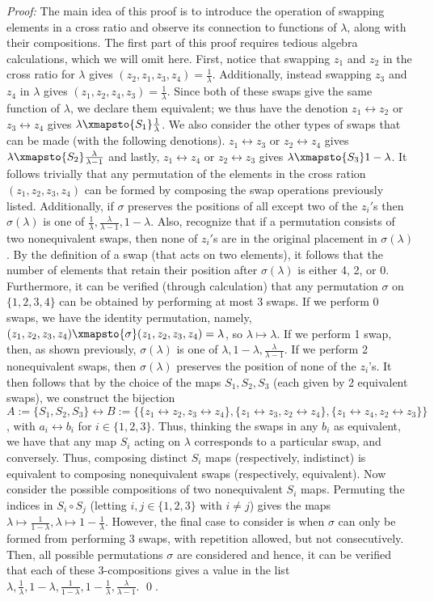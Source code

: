 \textit{Proof: } The main idea of this proof is to introduce the operation of swapping elements in a cross ratio and observe its connection to functions of $\lambda$, along with their compositions. The first part of this proof requires tedious algebra calculations, which we will omit here. First, notice that swapping $z_1$ and $z_2$ in the cross ratio for $\lambda$ gives $(z_2,z_1,z_3,z_4) = \frac{1}{\lambda}$. Additionally, instead swapping $z_3$ and $z_4$ in $\lambda$ gives $(z_1,z_2,z_4,z_3) = \frac{1}{\lambda}$. Since both of these swaps give the same function of $\lambda$, we declare them equivalent; we thus have the denotion $z_1 \leftrightarrow z_2$ or $z_3 \leftrightarrow z_4$ gives $\lambda \xmapsto{S_1} \frac{1}{\lambda}$. We also consider the other types of swaps that can be made (with the following denotions). $z_1 \leftrightarrow z_3$ or $z_2 \leftrightarrow z_4$ gives $\lambda \xmapsto{S_2} \frac{\lambda}{\lambda - 1}$ and lastly, $z_1 \leftrightarrow z_4$ or $z_2 \leftrightarrow z_3$ gives $\lambda \xmapsto{S_3} 1 - \lambda$. It follows trivially that any permutation of the elements in the cross ration $(z_1,z_2,z_3,z_4)$ can be formed by composing the swap operations previously listed. Additionally, if $\sigma$ preserves the positions of all except two of the $z_i'$s then $\sigma(\lambda)$ is one of $\frac{1}{\lambda}, \frac{\lambda}{\lambda - 1}, 1 - \lambda$. Also, recognize that if a permutation consists of two nonequivalent swaps, then none of $z_i'$s are in the original placement in $\sigma(\lambda)$. By the definition of a swap (that acts on two elements), it follows that the number of elements that retain their position after $\sigma(\lambda)$ is either 4, 2, or 0. Furthermore, it can be verified (through calculation) that any permutation $\sigma$ on $\{1,2,3,4\}$ can be obtained by performing at most 3 swaps. If we perform 0 swaps, we have the identity permutation, namely, $(z_1,z_2,z_3,z_4) \xmapsto{\sigma} (z_1,z_2,z_3,z_4) = \lambda$, so $\lambda \mapsto \lambda$. If we perform 1 swap, then, as shown previously, $\sigma(\lambda)$ is one of $\lambda, 1-\lambda, \frac{\lambda}{\lambda - 1}$. If we perform 2 nonequivalent swaps, then $\sigma(\lambda)$ preserves the position of none of the $z_i$'s. It then follows that by the choice of the maps $S_1,S_2,S_3$ (each given by 2 equivalent swaps), we construct the bijection $A:= \{S_1,S_2,S_3\} \leftrightarrow B:= \{\{z_1 \leftrightarrow z_2, z_3 \leftrightarrow z_4\}, \{z_1 \leftrightarrow z_3, z_2 \leftrightarrow z_4\}, \{z_1 \leftrightarrow z_4, z_2 \leftrightarrow z_3\}\}$, with $a_i \leftrightarrow b_i$ for $i \in \{1,2,3\}$. Thus, thinking the swaps in any $b_i$ as equivalent, we have that any map $S_i$ acting on $\lambda$ corresponds to a particular swap, and conversely. Thus, composing distinct $S_i$ maps (respectively, indistinct) is equivalent to composing nonequivalent swaps (respectively, equivalent). Now consider the possible compositions of two nonequivalent $S_i$ maps. Permuting the indices in $S_i \circ S_j$ (letting $i,j \in \{1,2,3\}$ with $i \neq j$) gives the maps $\lambda \mapsto \frac{1}{1 - \lambda}, \lambda \mapsto 1 - \frac{1}{\lambda}$. However, the final case to consider is when $\sigma$ can only be formed from performing 3 swaps, with repetition allowed, but not consecutively. Then, all possible permutations $\sigma$ are considered and hence, it can be verified that each of these 3-compositions gives a value in the list $\lambda, \frac{1}{\lambda}, 1 - \lambda, \frac{1}{1 - \lambda}, 1 - \frac{1}{\lambda}, \frac{\lambda}{\lambda - 1}$. \qed. 


